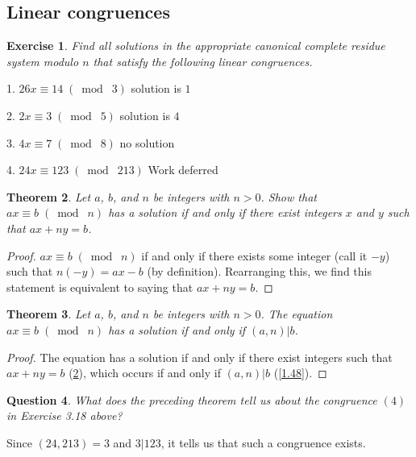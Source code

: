 \documentclass{article}
\newtheorem{thm}{Theorem}[section]
\newtheorem{ques}[thm]{Question}
\newtheorem{ex}[thm]{Exercise}
\numberwithin{equation}{thm}
\providecommand{\gmod}[1]{\; (\bmod \; #1)}
\begin{document}
\subsection*{Linear congruences}



\begin{ex} \label{3.18}
  Find all solutions in the appropriate canonical complete residue system modulo $n$ that satisfy the following linear congruences.
\end{ex}

1. $26x \equiv 14 \gmod 3$ solution is $1$

2. $2x \equiv 3 \gmod 5$ solution is $4$

3. $4x \equiv 7 \gmod 8$ no solution

4. $24x \equiv 123 \gmod{213}$ Work deferred



\begin{thm} \label{3.19}
  Let $a$, $b$, and $n$ be integers with $n > 0$. Show that $ax \equiv b \gmod n$ has a solution if and only if there exist integers $x$ and $y$ such that $ax + ny = b$.
\end{thm}

\begin{proof}
  $ax \equiv b \gmod n$ if and only if there exists some integer (call it $-y$) such that $n(-y) = ax - b$ (by definition). Rearranging this, we find this statement is equivalent to saying that $ax + ny = b$.
\end{proof}



\begin{thm} \label{3.20}
  Let $a$, $b$, and $n$ be integers with $n > 0$. The equation $ax \equiv b \gmod n$ has a solution if and only if $(a, n) | b$.
\end{thm}

\begin{proof}
  The equation has a solution if and only if there exist integers such that $ax + ny = b$ (\ref{3.19}), which occurs if and only if $(a, n) | b$ (\ref{1.48}).
\end{proof}



\begin{ques} \label{3.21}
  What does the preceding theorem tell us about the congruence $(4)$ in Exercise 3.18 above?
\end{ques}

Since $(24, 213) = 3$ and $3 | 123$, it tells us that such a congruence exists.
\end{document}
